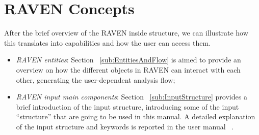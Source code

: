 \section{RAVEN Concepts}
\label{sec:RAVENconcept}
After the brief overview of the RAVEN inside structure, we can illustrate how this translates into capabilities and how the user can access them.

\begin{itemize}
    \item \textit{RAVEN entities}: Section ~\ref{sub:EntitiesAndFlow} is aimed to provide an overview on how the different objects in
    RAVEN can interact with each other, generating the user-dependent analysis flow;
    \item \textit{RAVEN input main components}: Section ~\ref{sub:InputStructure} provides a brief introduction of the input structure, introducing
    some of the input ``structure'' that are going to be used in this manual. A detailed explanation of the
    input structure and keywords is reported in the user manual ~\cite{RAVENuserManual}.
\end{itemize}

